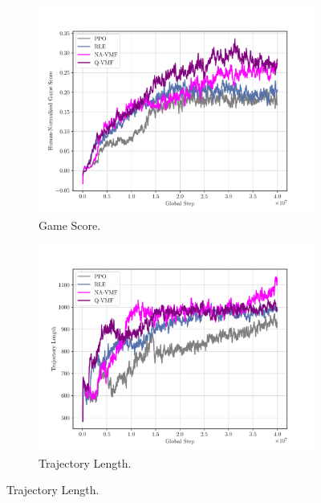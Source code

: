 \begin{figure}[H]
  \centering
  \begin{subfigure}[b]{0.49\textwidth}
    \centering
    \includegraphics[width=\textwidth]{figures/plot_Alien_VMF Human-Normalized Game Score.pdf}
    \caption{Game Score.}
    \label{fig:vmf-game-score}
  \end{subfigure}
  \hfill
  \begin{subfigure}[b]{0.49\textwidth}
    \centering
    \includegraphics[width=\textwidth]{figures/plot_Alien_VMF Trajectory Length.pdf}
    \caption{Trajectory Length.}
    \label{fig:vmf-trajectory-length}
  \end{subfigure}
\end{figure}


